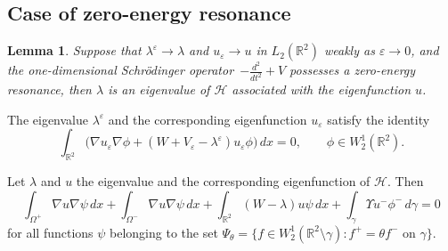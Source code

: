 \documentclass[reqno]{amsart}
\theoremstyle{plain}
\newtheorem{lem}{Lemma}
\numberwithin{equation}{section}
\newcommand{\Real}{\mathbb R}
\newcommand{\eps}{\varepsilon}
\newcommand{\cH}{\mathcal{H}}
\begin{document}
\subsection{Case of zero-energy resonance}




\begin{lem}\label{lemConvD}
  Suppose that $\lambda^\eps\to \lambda$ and $u_\eps\to u$ in $L_2(\Real^2)$ weakly as $\eps\to 0$, and   the one-dimensional Schr\"odinger operator~$-\frac{d^2}{d t^2}+V$  possesses a zero-energy resonance, then $\lambda$ is an eigenvalue of $\cH$ associated with the eigenfunction $u$.
\end{lem}






The eigenvalue $\lambda^\eps$ and the corresponding eigenfunction $u_\eps$ satisfy the identity
\begin{equation*}
   \int_{\Real^2}\big(\nabla u_\eps \nabla \phi+
              (W+V_\eps-\lambda^\eps)u_\eps \phi\big)\,dx=0, \qquad \phi\in W_2^1(\Real^2).
\end{equation*}


Let $\lambda$ and $u$ the eigenvalue and the corresponding eigenfunction of
 $\cH$. Then
\begin{equation*}
   \int_{\Omega^+}\nabla u \nabla \psi\,dx+\int_{\Omega^-}\nabla u \nabla \psi\,dx
   +\int_{\Real^2}(W-\lambda)u\psi\,dx
   +\int_\gamma \Upsilon u^-\phi^-\,d\gamma=0
\end{equation*}
for all functions $\psi$ belonging to the set $\Psi_\theta=\{f\in W_2^1(\Real^2\setminus \gamma)\colon f^+=\theta f^- \text{ on }\gamma\}$.
\end{document}
